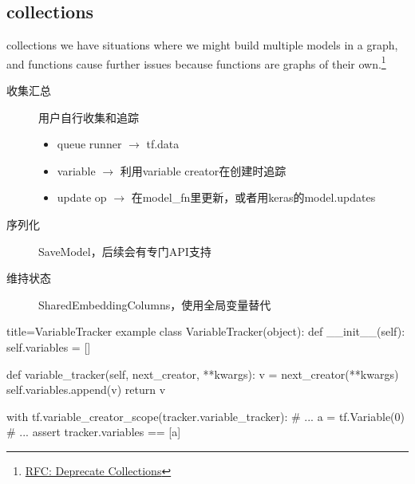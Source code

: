 
\subsection{collections}

\begin{frame}{collections}
    we have situations where we might build multiple models in a graph, and functions cause further issues because functions are graphs of their own.\footnote{\href{https://github.com/tensorflow/community/pull/17}{RFC: Deprecate Collections}}

    \begin{description}
        \item[收集汇总]  用户自行收集和追踪
            \begin{itemize}
                \item queue runner $\to$ tf.data
                \item variable $\to$ 利用variable creator在创建时追踪
                \item update op $\to$ 在model\_fn里更新，或者用keras的model.updates
            \end{itemize}
        \item[序列化]    SaveModel，后续会有专门API支持
        \item[维持状态]  SharedEmbeddingColumns，使用全局变量替代
    \end{description}
\end{frame}

\begin{frame}[fragile]
    \begin{tcblisting}{title=VariableTracker example}
            class VariableTracker(object):
              def __init__(self):
                self.variables = []

              def variable_tracker(self, next_creator, **kwargs):
                v = next_creator(**kwargs)
                self.variables.append(v)
                return v

            with tf.variable_creator_scope(tracker.variable_tracker):
              # ...
              a = tf.Variable(0)
              # ...
            assert tracker.variables == [a]
    \end{tcblisting}
\end{frame}
